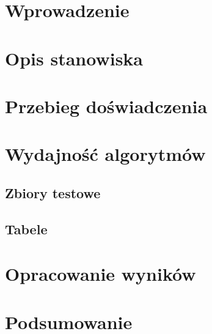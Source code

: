 \documentclass{sprawozdanie-agh}
\begin{document}

\stronatytulowa{}

\section{Wprowadzenie}

\section{Opis stanowiska}

\section{Przebieg doświadczenia}


\section{Wydajność algorytmów}
\subsection{Zbiory testowe}

\subsection{Tabele}



\section{Opracowanie wyników}
\section{Podsumowanie}
\end{document}
